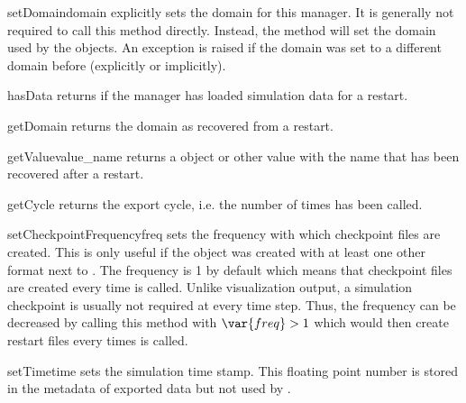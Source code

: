 \begin{methoddesc}[DataManager]{setDomain}{domain}
    explicitly sets the domain for this manager.
    It is generally not required to call this method directly.
    Instead, the  method will set the domain used by the \Data
    objects.
    An exception is raised if the domain was set to a different domain before
    (explicitly or implicitly).
\end{methoddesc}

\begin{methoddesc}[DataManager]{hasData}{}
    returns \True if the manager has loaded simulation data for a restart.
\end{methoddesc}

\begin{methoddesc}[DataManager]{getDomain}{}
    returns the domain as recovered from a restart.
\end{methoddesc}

\begin{methoddesc}[DataManager]{getValue}{value_name}
    returns a \Data object or other value with the name  that
    has been recovered after a restart.
\end{methoddesc}

\begin{methoddesc}[DataManager]{getCycle}{}
    returns the export cycle, i.e. the number of times  has been
    called.
\end{methoddesc}

\begin{methoddesc}[DataManager]{setCheckpointFrequency}{freq}
    sets the frequency with which checkpoint files are created. This is only
    useful if the  object was created with at least one other
    format next to . The frequency is 1 by default which means
    that checkpoint files are created every time  is called.
    Unlike visualization output, a simulation checkpoint is usually not
    required at every time step. Thus, the frequency can be decreased by
    calling this method with $\var{freq}>1$ which would then create restart
    files every  times  is called.
\end{methoddesc}

\begin{methoddesc}[DataManager]{setTime}{time}
    sets the simulation time stamp. This floating point number is stored in
    the metadata of exported data but not used by .
\end{methoddesc}

